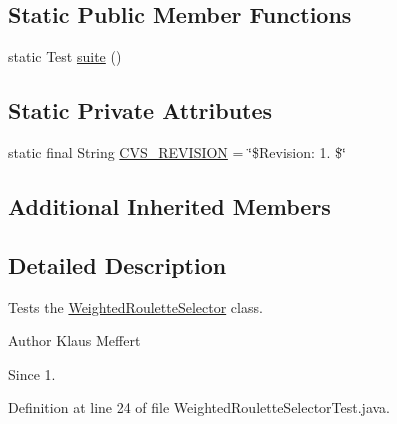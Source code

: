 \subsection*{Static Public Member Functions}
\begin{DoxyCompactItemize}
\item 
static Test \hyperlink{classorg_1_1jgap_1_1impl_1_1_weighted_roulette_selector_test_a7485d2be194506342af41de1db555986}{suite} ()
\end{DoxyCompactItemize}
\subsection*{Static Private Attributes}
\begin{DoxyCompactItemize}
\item 
static final String \hyperlink{classorg_1_1jgap_1_1impl_1_1_weighted_roulette_selector_test_a7cb1d9272d4e5e23ae32f75971484704}{C\-V\-S\-\_\-\-R\-E\-V\-I\-S\-I\-O\-N} = \char`\"{}\$Revision\-: 1. \$\char`\"{}
\end{DoxyCompactItemize}
\subsection*{Additional Inherited Members}


\subsection{Detailed Description}
Tests the \hyperlink{classorg_1_1jgap_1_1impl_1_1_weighted_roulette_selector}{Weighted\-Roulette\-Selector} class.

\begin{DoxyAuthor}{Author}
Klaus Meffert 
\end{DoxyAuthor}
\begin{DoxySince}{Since}
1. 
\end{DoxySince}


Definition at line 24 of file Weighted\-Roulette\-Selector\-Test.\-java.



